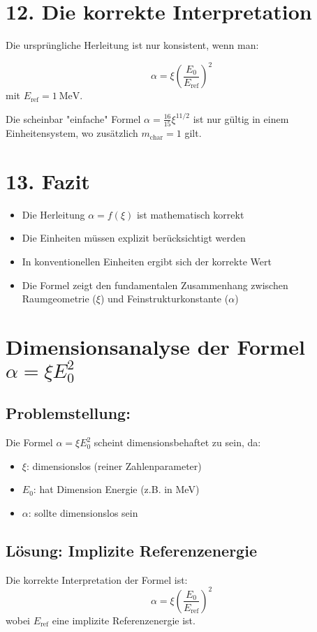 \documentclass[12pt, a4paper]{article}
\begin{document}
	\section*{12. Die korrekte Interpretation}
	
	Die ursprüngliche Herleitung ist nur konsistent, wenn man:
	
	\[
	\boxed{\alpha = \xi \left(\frac{E_0}{E_{\text{ref}}}\right)^2}
	\]
	mit $E_{\text{ref}} = \SI{1}{\MeV}$.
	
	Die scheinbar "einfache" Formel $\alpha = \frac{16}{15} \xi^{11/2}$ ist nur gültig in einem Einheitensystem, wo zusätzlich $m_{\text{char}} = 1$ gilt.
	
	\section*{13. Fazit}
	
	\begin{itemize}
		\item Die Herleitung $\alpha = f(\xi)$ ist mathematisch korrekt
		\item Die Einheiten müssen explizit berücksichtigt werden
		\item In konventionellen Einheiten ergibt sich der korrekte Wert
		\item Die Formel zeigt den fundamentalen Zusammenhang zwischen Raumgeometrie ($\xi$) und Feinstrukturkonstante ($\alpha$)
	\end{itemize}
	\section*{Dimensionsanalyse der Formel $\alpha = \xi E_0^2$}

\subsection*{Problemstellung:}
Die Formel $\alpha = \xi E_0^2$ scheint dimensionsbehaftet zu sein, da:
\begin{itemize}
	\item $\xi$: dimensionslos (reiner Zahlenparameter)
	\item $E_0$: hat Dimension Energie (z.B. in MeV)
	\item $\alpha$: sollte dimensionslos sein
\end{itemize}

\subsection*{Lösung: Implizite Referenzenergie}
Die korrekte Interpretation der Formel ist:
\[
\alpha = \xi \left(\frac{E_0}{E_{\text{ref}}}\right)^2
\]
wobei $E_{\text{ref}}$ eine implizite Referenzenergie ist.
\end{document}
